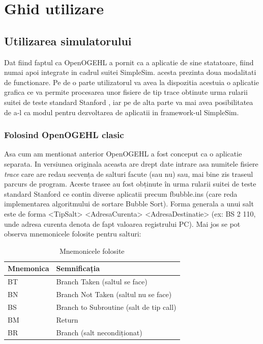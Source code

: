 \section{Ghid utilizare}
\subsection{Utilizarea simulatorului}

Dat fiind faptul ca OpenOGEHL a pornit ca a aplicatie de sine statatoare, fiind numai apoi integrate in cadrul suitei SimpleSim. acesta prezinta doua modalitati de functionare. Pe de o parte utilizatorul va avea la dispozitia acestuia o aplicatie grafica ce va permite procesarea unor fisiere de tip trace obtinute  urma rularii suitei de teste standard Stanford \cite{soac}, iar pe de alta parte va mai avea posibilitatea de a-l ca modul pentru dezvoltarea de aplicatii in framework-ul SimpleSim.

\subsubsection{Folosind OpenOGEHL clasic}
Asa cum am mentionat anterior OpenOGEHL a fost conceput ca o aplicatie separata. In versiunea originala aceasta are drept date intrare asa numitele fisiere \textit{trace} care are redau secvența de salturi facute (sau nu) sau, mai bine zis traseul parcurs de program. Aceste trasee au fost obținute în urma rularii suitei de teste standard Stanford ce contin diverse aplicatii precum fbubble.ins (care reda implementarea algoritmului de sortare Bubble Sort). Forma generala a unui salt este de forma <TipSalt> <AdresaCurenta> <AdresaDestinatie>\cite{soac} (ex: BS
2 110, unde adresa curenta denota de fapt valoarea registrului PC).
Mai jos se pot observa mnemonicele folosite pentru salturi:

\begin{table}[H]
	\centering
	\renewcommand{\arraystretch}{1.3}

	\begin{tabular}{|>{\centering\arraybackslash}m{3cm}|m{9cm}|}
		\hline
		\textbf{Mnemonica} & \textbf{Semnificația} \\
		\hline

		BT & Branch Taken (saltul se face) \\
		\hline

		BN & Branch Not Taken (saltul nu se face) \\
		\hline

		BS & Branch to Subroutine (salt de tip call) \\
		\hline

		BM & Return \\
		\hline

		BR & Branch (salt necondiționat) \\
		\hline
	\end{tabular}

	\caption{Mnemonicele folosite}
	\label{tab:branch_types}
\end{table}

